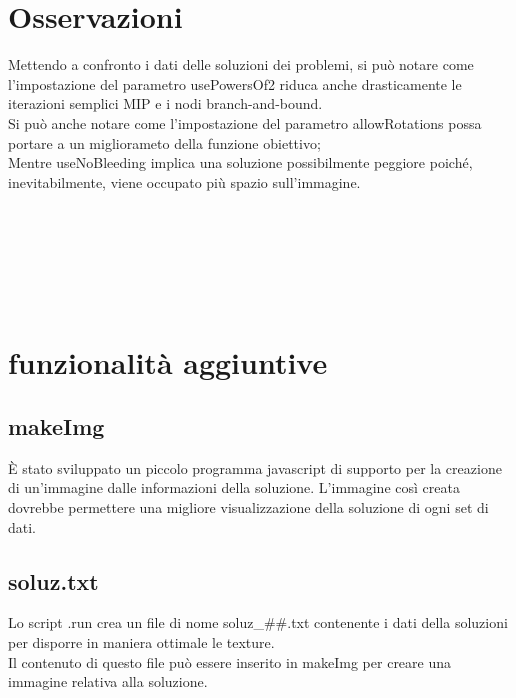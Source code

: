 
	\section{Osservazioni}
	
	Mettendo a confronto i dati delle soluzioni dei problemi, si può notare come l'impostazione del parametro usePowersOf2 riduca anche drasticamente le iterazioni semplici MIP e i nodi branch-and-bound. \\

	\noindent Si può anche notare come l'impostazione del parametro allowRotations possa portare a un migliorameto della funzione obiettivo; \\

	\noindent Mentre useNoBleeding implica una soluzione possibilmente peggiore poiché, inevitabilmente, viene occupato più spazio sull'immagine.

\ \\
\ \\
\ \\
\ \\
\ \\






\section{funzionalità aggiuntive}

\subsection{makeImg}
È stato sviluppato un piccolo programma javascript di supporto per la creazione di un'immagine dalle informazioni della soluzione. L'immagine così creata dovrebbe permettere una migliore visualizzazione della soluzione di ogni set di dati. 

\subsection{soluz.txt}
Lo script .run crea un file di nome soluz\_\#\#.txt contenente i dati della soluzioni per disporre in maniera ottimale le texture. \\
Il contenuto di questo file può essere inserito in makeImg per creare una immagine relativa alla soluzione.

\newpage
